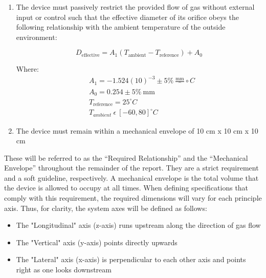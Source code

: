 \documentclass[12pt, letterpaper]{report}%
\newcommand{\degC}{^{\circ}C}    %
\newcommand{\requiredRelationship}{D_{\text{effective}} = A_1 (T_{\text{ambient}} - T_{\text{reference}}) + A_0}
\newcommand{\specTempHigh}{80} %
\newcommand{\specTempLow}{-60} %
\newcommand{\specTempRef}{25} %
\newcommand{\specTolerancePercent}{\pm 5\%}
\newcommand{\specDeffConstOne}{-1.524(10)^{-3}} %
\newcommand{\specDeffConstTwo}{0.254} %
\begin{document}
        \begin{enumerate}
            \item The device must passively restrict the provided flow of gas without external input or control such that the effective diameter of its orifice obeys the following relationship with the ambient temperature of the outside environment:
            
                \begin{equation}
                    \requiredRelationship
                    \label{eq: required_relationship}
                \end{equation}

                Where:
                \begin{align*}
                    &A_1 = \specDeffConstOne \specTolerancePercent\ \frac{\text{mm}}\degC
                    \\
                    &A_0 = \specDeffConstTwo \specTolerancePercent\ \text{mm}
                    \\
                    &T_{\text{reference}} = \specTempRef \degC
                    \\
                    &T_{ambient}\ \epsilon\ [\specTempLow, \specTempHigh] \degC 
                \end{align*}

            \item The device must remain within a mechanical envelope of 10 cm x 10 cm x 10 cm
        \end{enumerate}
        
        These will be referred to as the “Required Relationship” and the “Mechanical Envelope” throughout the remainder of the report. They are a strict requirement and a soft guideline, respectively.
        A mechanical envelope is the total volume that the device is allowed to occupy at all times.
        When defining specifications that comply with this requirement, the required dimensions will vary for each principle axis.
        Thus, for clarity, the system axes will be defined as follows:

        \begin{itemize}
            \item The "Longitudinal" axis (z-axis) runs upstream along the direction of gas flow
            \item The "Vertical" axis (y-axis) points directly upwards
            \item The "Lateral" axis (x-axis) is perpendicular to each other axis and points right as one looks downstream
        \end{itemize}
\end{document}
